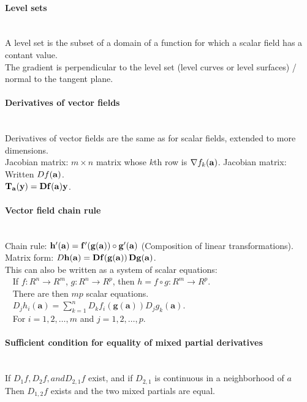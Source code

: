 \documentclass[10pt]{article}
\newcommand{\bs}[1]{\pmb{#1}}
\begin{document}
\paragraph{Level sets}\ \\
A level set is the subset of a domain of a function for which a scalar field has a contant value.\\
The gradient is perpendicular to the level set (level curves or level surfaces) / normal to the tangent plane.

\paragraph{Derivatives of vector fields}\ \\
Derivatives of vector fields are the same as for scalar fields, extended to more dimensions.\\
Jacobian matrix: $m \times n$ matrix whose $k$th row is $\nabla f_k(\bf{a})$.
Jacobian matrix: Written $Df(\bf{a})$.\\
$\bf{T}_{\bf{a}}(\bf{y}) = D\bf{f}(\bf{a})\bf{y}$.

\paragraph{Vector field chain rule}\ \\
Chain rule: $\bf{h}'(\bf{a}) = \bf{f}'(\bf{g}(\bf{a})) \circ \bf{g}'(\bf{a})$ (Composition of linear transformations).\\
Matrix form: $D\bf{h}(\bf{a}) = D\bf{f}(\bf{g}(\bf{a}))\, D\bf{g}(\bf{a})$.\\
This can also be written as a system of scalar equations:\\
$\phantom{x}$ If $f: R^n \to R^m$, $g: R^n \to R^p$, then $h = f \circ g: R^m \to R^p$.\\
$\phantom{x}$ There are then $mp$ scalar equations.\\
$\phantom{x}$ $D_jh_i(\bs{a}) = \sum_{k=1}^n D_kf_i(\bs{g}(\bs{a}))D_jg_k(\bs{a})$.\\
$\phantom{x}$ For $i = 1, 2, \dotsc, m$ and $j = 1, 2, \dotsc, p$.

\paragraph{Sufficient condition for equality of mixed partial derivatives}\ \\
If $D_1f, D_2f, and D_{2,1}f$ exist, and if $D_{2,1}$ is continuous in a neighborhood of $a$\\
Then $D_{1,2}f$ exists and the two mixed partials are equal.
\end{document}
